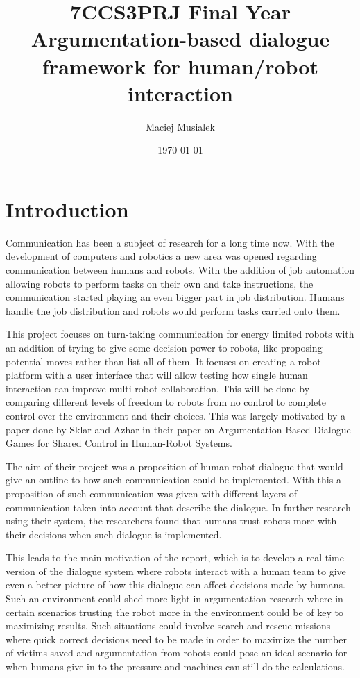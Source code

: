 \documentclass[11pt]{informatics-report}
\title{7CCS3PRJ Final Year\\\vspace{0.2cm}Argumentation-based dialogue framework for human/robot interaction}
\author{Maciej Musialek}
\date{\today}
\begin{document}
\createFrontMatter
\onehalfspacing
\tableofcontents
\doublespacing


\chapter{Introduction}
	Communication has been a subject of research for a long time now. With the development of computers and robotics a new area was opened regarding communication between humans and robots. With the addition of job automation allowing robots to perform tasks on their own and take instructions, the communication started playing an even bigger part in job distribution. Humans handle the job distribution and robots would perform tasks carried onto them.

    This project focuses on turn-taking communication for energy limited robots with an addition of trying to give some decision power to robots, like proposing potential moves rather than list all of them. It focuses on creating a robot platform with a user interface that will allow testing how single human interaction can improve multi robot collaboration. This will be done by comparing different levels of freedom to robots from no control to complete control over the environment and their choices. This was largely motivated by a paper done by Sklar and Azhar\cite{Elizabeth} in their paper on Argumentation-Based Dialogue Games for Shared Control in Human-Robot Systems.

    The aim of their project was a proposition of human-robot dialogue that would give an outline to how such communication could be implemented. With this a proposition of such communication was given with different layers of communication taken into account that describe the dialogue. In further research using their system, the researchers found that humans trust robots more with their decisions when such dialogue is implemented.

    This leads to the main motivation of the report, which is to develop a real time version of the dialogue system where robots interact with a human team to give even a better picture of how this dialogue can affect decisions made by humans. Such an environment could shed more light in argumentation research where in certain scenarios trusting the robot more in the environment could be of key to maximizing results. Such situations could involve search-and-rescue missions where quick correct decisions need to be made in order to maximize the number of victims saved and argumentation from robots could pose an ideal scenario for when humans give in to the pressure and machines can still do the calculations.
\end{document}
